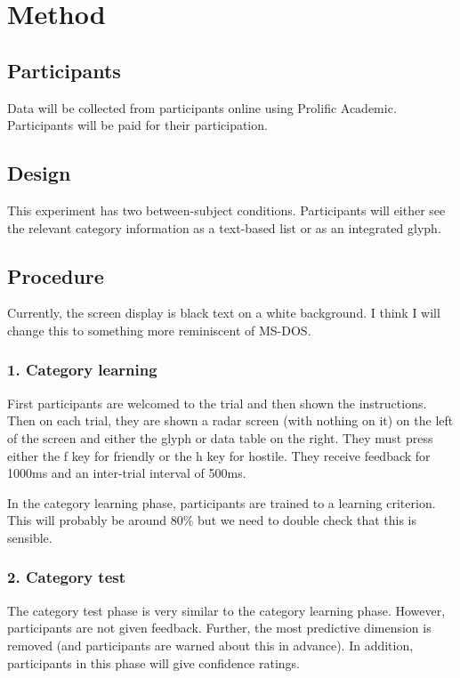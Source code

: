 \documentclass[doc, a4paper, apacite]{apa6}
\begin{document}
%

\section{Method}
\subsection{Participants}
Data will be collected from participants online using Prolific Academic. 
Participants will be paid for their participation.

\subsection{Design}
This experiment has two between-subject conditions. 
Participants will either see the relevant category information as a text-based list or as an integrated glyph. 

\subsection{Procedure}
Currently, the screen display is black text on a white background. 
I think I will change this to something more reminiscent of MS-DOS. 

\subsubsection{1. Category learning}
First participants are welcomed to the trial and then shown the instructions. 
Then on each trial, they are shown a radar screen (with nothing on it) on the left of the screen and either the glyph or data table on the right. 
They must press either the f key for friendly or the h key for hostile. 
They receive feedback for 1000ms and an inter-trial interval of 500ms. 

In the category learning phase, participants are trained to a learning criterion.
This will probably be around 80\% but we need to double check that this is sensible. 

\subsubsection{2. Category test}
The category test phase is very similar to the category learning phase. 
However, participants are not given feedback. 
Further, the most predictive dimension is removed (and participants are warned about this in advance). 
In addition, participants in this phase will give confidence ratings. 
\end{document}
